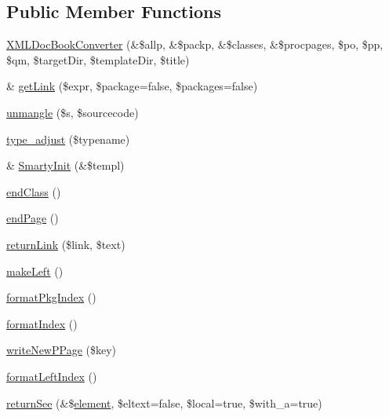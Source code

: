 \subsection*{\-Public \-Member \-Functions}
\begin{DoxyCompactItemize}
\item 
\hyperlink{class_x_m_l_doc_book_converter_a2faa4ab6a00500116b3fdcb56ae7c3d8}{\-X\-M\-L\-Doc\-Book\-Converter} (\&\$allp, \&\$packp, \&\$classes, \&\$procpages, \$po, \$pp, \$qm, \$target\-Dir, \$template\-Dir, \$title)
\item 
\& \hyperlink{class_x_m_l_doc_book_converter_a345f04cedd6f4707f74d6858ae318da8}{get\-Link} (\$expr, \$package=false, \$packages=false)
\item 
\hyperlink{class_x_m_l_doc_book_converter_afb9428c43b03027ffc7cffebe39c47a7}{unmangle} (\$s, \$sourcecode)
\item 
\hyperlink{class_x_m_l_doc_book_converter_af92d383cc0eaed9523b706b2fbf9dbb3}{type\-\_\-adjust} (\$typename)
\item 
\& \hyperlink{class_x_m_l_doc_book_converter_a7ed01c3315cd29f50a08d695548da9ae}{\-Smarty\-Init} (\&\$templ)
\item 
\hyperlink{class_x_m_l_doc_book_converter_ae4962a5674fd1be0f3795cb72f2974bf}{end\-Class} ()
\item 
\hyperlink{class_x_m_l_doc_book_converter_a7e7c9e2e7d88f78fa6f8bf8776c443e5}{end\-Page} ()
\item 
\hyperlink{class_x_m_l_doc_book_converter_af40fcd39ab514ae82e555a451dd72dc2}{return\-Link} (\$link, \$text)
\item 
\hyperlink{class_x_m_l_doc_book_converter_aad3f0d3857e7995a1ede44d9b901e2d4}{make\-Left} ()
\item 
\hyperlink{class_x_m_l_doc_book_converter_a37200c9f589ee4eaeed637c5ce1af356}{format\-Pkg\-Index} ()
\item 
\hyperlink{class_x_m_l_doc_book_converter_a963f73984fad30cb1776cd293eeb7db7}{format\-Index} ()
\item 
\hyperlink{class_x_m_l_doc_book_converter_a6b7e21b9959092d614a9c07a447c2643}{write\-New\-P\-Page} (\$key)
\item 
\hyperlink{class_x_m_l_doc_book_converter_a39bb30299ec5d6ba31096e51f2bcc4b4}{format\-Left\-Index} ()
\item 
\hyperlink{class_x_m_l_doc_book_converter_aabb194e1ca02651a000846412f0049ff}{return\-See} (\&\$\hyperlink{bug-904820_8php_aa94081298ab2dfd0f261cce6c203d9aa}{element}, \$eltext=false, \$local=true, \$with\-\_\-a=true)

\end{DoxyCompactItemize}
